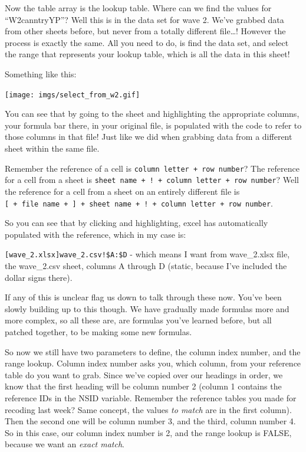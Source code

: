 \documentclass[]{book}
\theoremstyle{definition}
\theoremstyle{definition}
\theoremstyle{definition}
\theoremstyle{remark}
\begin{document}
Now the table array is the lookup table. Where can we find the values
for ``W2canntryYP''? Well this is in the data set for wave 2. We've
grabbed data from other sheets before, but never from a totally
different file\ldots{}! However the process is exactly the same. All you
need to do, is find the data set, and select the range that represents
your lookup table, which is all the data in this sheet!

Something like this:

\texttt{[image: imgs/select\_from\_w2.gif]}

You can see that by going to the sheet and highlighting the appropriate
columns, your formula bar there, in your original file, is populated
with the code to refer to those columns in that file! Just like we did
when grabbing data from a different sheet within the same file.

Remember the reference of a cell is
\texttt{column\ letter\ +\ row\ number}? The reference for a cell from a
sheet is \texttt{sheet\ name\ +\ !\ +\ column\ letter\ +\ row\ number}?
Well the reference for a cell from a sheet on an entirely different file
is
\texttt{{[}\ +\ file\ name\ +\ {]}\ +\ sheet\ name\ +\ !\ +\ column\ letter\ +\ row\ number}.

So you can see that by clicking and highlighting, excel has
automatically populated with the reference, which in my case is:

\texttt{{[}wave\_2.xlsx{]}wave\_2.csv!\$A:\$D} - which means I want from
wave\_2.xlsx file, the wave\_2.csv sheet, columns A through D (static,
because I've included the dollar signs there).

If any of this is unclear flag us down to talk through these now. You've
been slowly building up to this though. We have gradually made formulas
more and more complex, so all these are, are formulas you've learned
before, but all patched together, to be making some new formulas.

So now we still have two parameters to define, the column index number,
and the range lookup. Column index number asks you, which column, from
your reference table do you want to grab. Since we've copied over our
headings in order, we know that the first heading will be column number
2 (column 1 contains the reference IDs in the NSID variable. Remember
the reference tables you made for recoding last week? Same concept, the
values \emph{to match} are in the first column). Then the second one
will be column number 3, and the third, column number 4. So in this
case, our column index number is 2, and the range lookup is FALSE,
because we want an \emph{exact match}.
\end{document}

